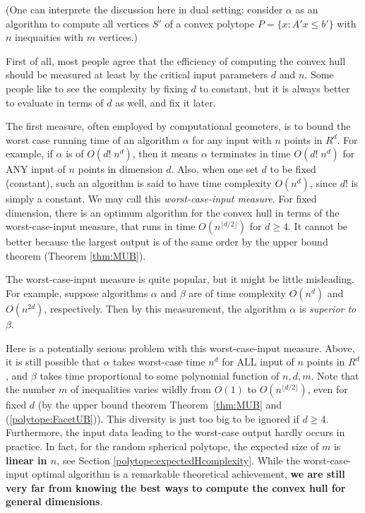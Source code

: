 \documentclass[[a4paper,12pt]{article}
\begin{document}
(One can interprete the discussion here
in dual setting: consider $\alpha$ as an algorithm to compute
all vertices $S'$ of a convex polytope $P=\{x : A' x \le b' \}$
with $n$ inequaities with $m$ vertices.)

First of all, most people agree that the efficiency of 
computing the convex hull 
should be measured at least by the critical
input parameters $d$ and $n$.  Some people
like to see the complexity by fixing $d$ to
constant, but it is always better to evaluate
in terms of $d$ as well, and fix it later.

The first measure, often employed by computational geometers, is
to bound the worst case running time of an algorithm $\alpha$ for any
input with $n$ points in $R^d$.  For example, if $\alpha$ is of
$O(d! \; n^d)$, then it means $\alpha$ terminates in time 
$O(d! \; n^d)$ for ANY input of $n$ points in dimension $d$.
Also, when one set $d$ to be fixed (constant), such an algorithm
is said to have time complexity $O(n^d)$, since $d!$ is simply
a constant.   We may call this {\em worst-case-input measure}.
For fixed dimension, 
there is an optimum algorithm \cite{c-ochaa-93} for the convex hull in terms of 
the worst-case-input measure, that runs in time $O(n^{\lfloor d/2 \rfloor})$
for $d\ge 4$.
It  cannot be better because the largest output is of
the same order by the upper bound theorem (Theorem \ref{thm:MUB}).

The worst-case-input measure
is quite popular, but it might be little misleading.  
For example, suppose algorithms $\alpha$ and $\beta$ are of time complexity
$O(n^d)$ and $O(n^{2d})$, respectively.  Then by this measurement, 
the algorithm $\alpha$ is {\em superior to\/} $\beta$.  

Here is a potentially serious problem with this worst-case-input measure.
Above, it is still possible that $\alpha$ takes worst-case time $n^d$ for
ALL input of $n$ points in $R^d$, and $\beta$ takes time proportional
to some polynomial function of $n, d, m$.   
Note that the number $m$ of inequalities varies
wildly from $O(1)$ to $O(n^{\lfloor d/2 \rfloor})$, even for fixed $d$
(by the upper bound theorem Theorem~\ref{thm:MUB} and (\ref{polytope:FacetUB})).  This diversity is just too big to be ignored
if $d \ge 4$.
Furthermore, the input data leading to the worst-case output
hardly occurs in practice.  In fact, for the random spherical polytope,
the expected size of $m$ is {\bf linear in $n$}, see Section 
\ref{polytope:expectedHcomplexity}.
While the worst-case-input optimal
algorithm \cite{c-ochaa-93} is a remarkable theoretical achievement,
{\bf we are still very far from knowing the best ways 
to compute the convex hull for general dimensions}.
\end{document}
